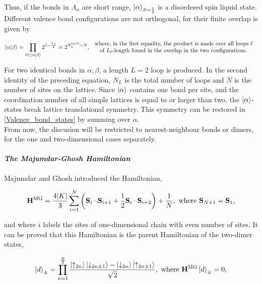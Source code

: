 \documentclass{homework}
\begin{document}
Thus, if the bonds in $\Lambda_{\alpha}$ are short range, $\ket{\alpha}_{S=\frac{1}{2}}$ is a disordered spin liquid state. Different valence bond configurations are not orthogonal, for their finite overlap is given by 

\begin{equation}
    \bra{\alpha}\ket{\beta} = \prod_{\ell \in \bra{\alpha}\ket{\beta}} 2^{1- \frac{L_{\ell}}{2}} = 2^{N_{L}^{(\alpha \beta)} - N}, \begin{array}{c}
         \textnormal{ where, in the first equality, the product is made over all loops $\ell$  } \\
         \textnormal{ of $L_{\ell}$-length found in the overlap in the two configurations.  }
    \end{array} 
\end{equation}

For two identical bonds in $\alpha, \beta$, a length $L = 2$ loop is produced. In the second identity of the preceding equation, $N_L$ is the total number of loops and $N$ is the number of sites on the lattice. Since $\ket{\alpha}$ contains one bond per site, and the coordination number of all simple lattices is equal to or larger than two, the $\ket{\alpha}$-states break lattice translational symmetry. This symmetry can be restored in \cref{Valence_bond_states} by summing over $\alpha$. \\

From now, the discusion will be restricted to nearest-neighbour bonds or dimers, for the one and two-dimensional cases separately. \\

\paragraph{\textit{The Majumdar-Ghosh Hamiltonian}}

Majumdar and Ghosh introduced the Hamiltonian,

\begin{equation}
    {\bf H}^{\textnormal{MG}} = \frac{4 |K|}{3} \sum_{i=1}^N \bigg({\bf S}_i \cdot {\bf S}_{i+1} + \frac{1}{2} {\bf S}_{i} \cdot {\bf S}_{i+2}\bigg) + \frac{1}{N}, \textnormal{ where } {\bf S}_{N+1} = {\bf S}_1,
\end{equation}

and where $i$ labels the sites of one-dimensional chain with even number of sites. It can be proved that this Hamiltonian is the parent Hamiltonian of the two-dimer states, 

\begin{equation}
    \ket{d}_{\pm} = \prod_{n=1}^{\frac{N}{2}} \frac{\ket{\uparrow_{2n}} \ket{\downarrow_{2n\pm1}} - \ket{\downarrow_{2n}} \ket{\uparrow_{2n \pm 1}}}{\sqrt{2}}, \textnormal{ where } {\bf H}^{\textnormal{MG}} \ket{d}_{\pm} = 0, 
    \label{dimer_states}
\end{equation}
\end{document}
